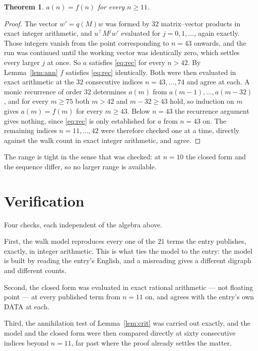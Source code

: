 \documentclass[11pt,a4paper]{article}
\theoremstyle{plain}
\newtheorem{theorem}{Theorem}
\theoremstyle{definition}
\begin{document}
\begin{theorem}
$a(n)=f(n)$ for every $n\ge11$.
\end{theorem}

\begin{proof}
The vector $w'=q(M)w$ was formed by $32$ matrix--vector products in exact integer
arithmetic, and $u^{\!\top}M^{j}w'$ evaluated for $j=0,1,\dots$, again exactly. Those integers
vanish from the point corresponding to $n=43$ onwards, and the run was continued until the
working vector was identically zero, which settles every larger $j$ at once. So $a$ satisfies
\eqref{eq:rec} for every $n>42$. By Lemma~\ref{lem:ann} $f$ satisfies \eqref{eq:rec}
identically. Both were then evaluated in exact arithmetic at the $32$ consecutive indices
$n=43,\dots,74$ and agree at each. A monic recurrence of order $32$
determines $a(m)$ from $a(m-1),\dots,a(m-32)$, and for every $m\ge75$ both
$m>42$ and $m-32\ge43$ hold, so induction on $m$ gives $a(m)=f(m)$ for every
$m\ge43$.
Below $n=43$ the recurrence argument gives nothing, since \eqref{eq:rec} is only
established for $a$ from $n=43$ on. The remaining indices $n=11,\dots,42$ were
therefore checked one at a time, directly against the walk count in exact integer arithmetic,
and agree.
\end{proof}

The range is tight in the sense that was checked: at $n=10$ the closed form and the sequence differ, so no larger range is available.

\section{Verification}

Four checks, each independent of the algebra above.

First, the walk model reproduces every one of the $21$ terms the entry publishes,
exactly, in integer arithmetic. This is what ties the model to the entry: the model is built
by reading the entry's English, and a misreading gives a different digraph and different
counts.

Second, the closed form was evaluated in exact rational arithmetic --- not floating point ---
at every published term from $n=11$ on, and agrees with the entry's own DATA at each.

Third, the annihilation test of Lemma~\ref{lem:crit} was carried out exactly, and the model
and the closed form were then compared directly at sixty consecutive indices beyond
$n=11$, far past where the proof already settles the matter.
\end{document}
